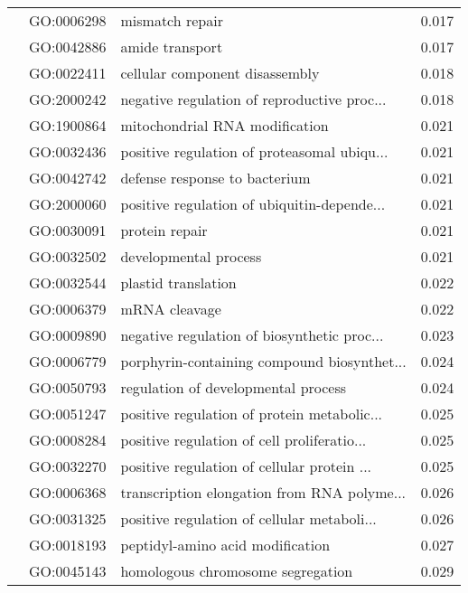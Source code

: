 \begin{longtable}{lllr}
   & GO:0006298 &                              mismatch repair &         0.017 \\
   & GO:0042886 &                              amide transport &         0.017 \\
   & GO:0022411 &               cellular component disassembly &         0.018 \\
   & GO:2000242 &  negative regulation of reproductive proc... &         0.018 \\
   & GO:1900864 &               mitochondrial RNA modification &         0.021 \\
   & GO:0032436 &  positive regulation of proteasomal ubiqu... &         0.021 \\
   & GO:0042742 &                defense response to bacterium &         0.021 \\
   & GO:2000060 &  positive regulation of ubiquitin-depende... &         0.021 \\
   & GO:0030091 &                               protein repair &         0.021 \\
   & GO:0032502 &                        developmental process &         0.021 \\
   & GO:0032544 &                          plastid translation &         0.022 \\
   & GO:0006379 &                                mRNA cleavage &         0.022 \\
   & GO:0009890 &  negative regulation of biosynthetic proc... &         0.023 \\
   & GO:0006779 &  porphyrin-containing compound biosynthet... &         0.024 \\
   & GO:0050793 &          regulation of developmental process &         0.024 \\
   & GO:0051247 &  positive regulation of protein metabolic... &         0.025 \\
   & GO:0008284 &  positive regulation of cell proliferatio... &         0.025 \\
   & GO:0032270 &  positive regulation of cellular protein ... &         0.025 \\
   & GO:0006368 &  transcription elongation from RNA polyme... &         0.026 \\
   & GO:0031325 &  positive regulation of cellular metaboli... &         0.026 \\
   & GO:0018193 &             peptidyl-amino acid modification &         0.027 \\
   & GO:0045143 &            homologous chromosome segregation &         0.029 \\

\end{longtable}
